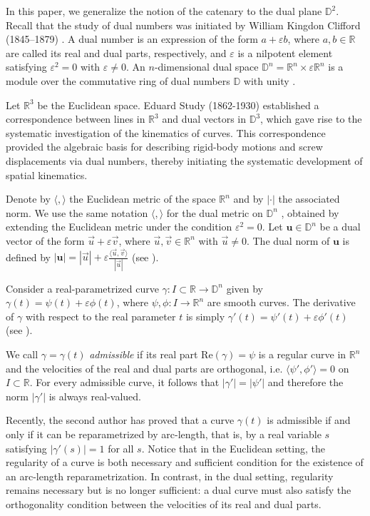 \documentclass[a4paper,12pt]{amsart}
\theoremstyle{definition}
\def\r{\mathbb R}
\def\d{\mathsf d}
\def\d{\mathbb D}
\begin{document}
In this paper, we generalize the notion of the catenary to the dual plane $\d^2$. Recall that the study of dual numbers was initiated by William Kingdon Clifford (1845--1879) \cite{clif}. A dual number is an expression of the form $a+\varepsilon b$, where $a,b\in \r$ are  called its real and dual parts, respectively, and $\varepsilon$ is a nilpotent element satisfying $\varepsilon^2=0$ with $\varepsilon\neq0$. An $n$-dimensional dual space $\d^n=\r^n \times \varepsilon \r^n$ is a module over the commutative ring of dual numbers $\d$ with unity \cite{vel}.

Let $\r^3$ be the Euclidean space. Eduard Study (1862-1930) \cite{stud} established a correspondence between lines in $\r^3$ and dual vectors in $\d^3$,  which gave rise to the systematic investigation of the kinematics of curves. This correspondence provided the algebraic basis for describing rigid-body motions and screw displacements via dual numbers, thereby initiating the systematic development of spatial kinematics.

Denote by $\langle,\rangle$ the Euclidean metric of the space $\r^n$ and by $|\cdot|$ the associated norm. We use the same notation $\langle,\rangle$ for the dual metric on $\d^n$ , obtained by extending the Euclidean metric under the condition $\varepsilon^2=0$. Let $\mathbf{u}\in \d^n$ be a dual vector of the form $\vec{u}+\varepsilon \vec{v}$, where $\vec{u},\vec{v}\in \r^n$ with $\vec{u}\neq 0$. The dual norm of $\mathbf{u}$ is defined by $|\mathbf{u}|=|\vec{u}|+\varepsilon \frac{\langle \vec{u},\vec{v}\rangle }{|\vec{u}|}$ (see \cite{vel}).

Consider a real-parametrized curve $\gamma:I\subset \r \to\d^n$ given by $\gamma(t)=\psi(t)+\varepsilon \phi (t)$, where $\psi,\phi:I\to \r^n$ are smooth curves. The derivative of $\gamma$ with respect to the real parameter $t$ is simply $\gamma'(t)=\psi'(t)+\varepsilon \phi' (t)$ (see \cite{adg,dim}). 

We call $\gamma=\gamma(t)$ {\it admissible} if its real part $\mbox{Re}(\gamma)=\psi$ is a regular curve in $\r^n$ and the velocities of the real and dual parts are orthogonal, i.e. $\langle \psi',\phi'\rangle=0$ on $I\subset \r$. For every admissible curve, it follows that $|\gamma'|=|\psi'|$ and therefore the norm $|\gamma'|$ is always real-valued.

Recently, the second author \cite{lo} has proved that a curve $\gamma(t)$ is admissible if and only if it can be reparametrized by arc-length, that is, by a real variable $s$ satisfying $|\gamma'(s)|=1$ for all $s$. Notice that in the Euclidean setting, the regularity of a curve is both necessary and sufficient condition for the existence of an arc-length reparametrization. In contrast, in the dual setting, regularity remains necessary but is no longer sufficient: a dual curve must also satisfy the orthogonality condition between the velocities of its real and dual parts.
\end{document}
